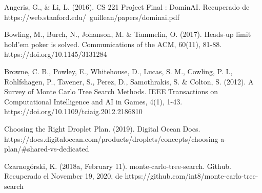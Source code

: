 \documentclass[11pt, oneside]{book}
\begin{document}
\begin{thebibliography}{111}






       Angeris, G., \& Li, L. (2016). CS 221 Project Final :
      DominAI. Recuperado de
      https://web.stanford.edu/~guillean/papers/dominai.pdf

      Bowling, M., Burch, N., Johanson, M. \& Tammelin, O.
      (2017). Heads-up limit hold’em poker is solved. Communications of the ACM,
      60(11), 81-88. https://doi.org/10.1145/3131284

      Browne, C. B., Powley, E., Whitehouse, D., Lucas, S. M.,
      Cowling, P. I., Rohlfshagen, P., Tavener, S., Perez, D., Samothrakis, S. \&
      Colton, S. (2012). A Survey of Monte Carlo Tree Search Methods. IEEE
      Transactions on Computational Intelligence and AI in Games, 4(1), 1-43.
      https://doi.org/10.1109/tciaig.2012.2186810

      Choosing the Right Droplet Plan. (2019). Digital Ocean
      Docs.
      https://docs.digitalocean.com/products/droplets/concepts/choosing-a-plan/\#shared-vs-dedicated

      Czarnogórski, K. (2018a, February 11).
      monte-carlo-tree-search. Github. Recuperado el November 19, 2020, de
      https://github.com/int8/monte-carlo-tree-search
      

\end{thebibliography}
\end{document}
